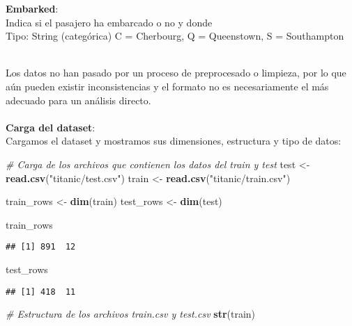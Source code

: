 \documentclass[
]{article}
\newenvironment{Shaded}{\begin{snugshade}}{\end{snugshade}}
\newcommand{\CommentTok}[1]{\textcolor[rgb]{0.56,0.35,0.01}{\textit{#1}}}
\newcommand{\KeywordTok}[1]{\textcolor[rgb]{0.13,0.29,0.53}{\textbf{#1}}}
\newcommand{\NormalTok}[1]{#1}
\newcommand{\StringTok}[1]{\textcolor[rgb]{0.31,0.60,0.02}{#1}}
\begin{document}
\textbf{Embarked}:\\
Indica si el pasajero ha embarcado o no y donde\\
Tipo: String (categórica) C = Cherbourg, Q = Queenstown, S = Southampton

\texttt{}\\
Los datos no han pasado por un proceso de preprocesado o limpieza, por
lo que aún pueden existir inconsistencias y el formato no es
necesariamente el más adecuado para un análisis directo. \texttt{}\\
\texttt{}~\\
\textbf{Carga del dataset}: \texttt{}\\
Cargamos el dataset y mostramos sus dimensiones, estructura y tipo de
datos: \texttt{}

\begin{Shaded}
\begin{Highlighting}[]
\CommentTok{# Carga de los archivos que contienen los datos del train y test}
\NormalTok{test <-}\StringTok{ }\KeywordTok{read.csv}\NormalTok{(}\StringTok{"titanic/test.csv"}\NormalTok{)}
\NormalTok{train <-}\StringTok{ }\KeywordTok{read.csv}\NormalTok{(}\StringTok{"titanic/train.csv"}\NormalTok{)}

\NormalTok{train_rows <-}\StringTok{ }\KeywordTok{dim}\NormalTok{(train)}
\NormalTok{test_rows <-}\StringTok{ }\KeywordTok{dim}\NormalTok{(test)}

\NormalTok{train_rows}
\end{Highlighting}
\end{Shaded}

\begin{verbatim}
## [1] 891  12
\end{verbatim}

\begin{Shaded}
\begin{Highlighting}[]
\NormalTok{test_rows}
\end{Highlighting}
\end{Shaded}

\begin{verbatim}
## [1] 418  11
\end{verbatim}

\texttt{}

\begin{Shaded}
\begin{Highlighting}[]
\CommentTok{# Estructura de los archivos train.csv y test.csv}
\KeywordTok{str}\NormalTok{(train)}
\end{Highlighting}
\end{Shaded}
\end{document}
